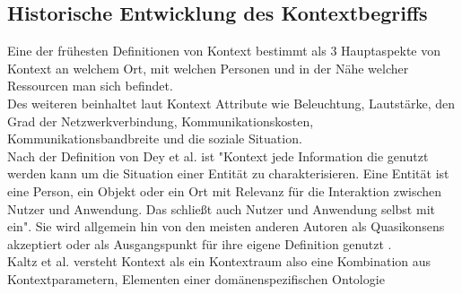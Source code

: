 \subsection{Historische Entwicklung des Kontextbegriffs}


Eine der frühesten Definitionen von Kontext \cite{schilit_context-aware_1994} bestimmt als 3 Hauptaspekte von Kontext an welchem Ort, mit welchen Personen und in der Nähe welcher Ressourcen man sich befindet.\\
Des weiteren beinhaltet laut  \cite{schilit_context-aware_1994} Kontext Attribute wie Beleuchtung, Lautstärke, den Grad der Netzwerkverbindung, Kommunikationskosten, Kommunikationsbandbreite und die soziale Situation.\\
Nach der Definition von Dey et al. \cite{dey_understanding_2001} ist "Kontext jede Information die genutzt werden kann um die Situation einer Entität zu charakterisieren. Eine Entität ist eine Person, ein Objekt oder ein Ort mit Relevanz für die Interaktion zwischen Nutzer und Anwendung. Das schließt auch Nutzer und Anwendung selbst mit ein".
Sie wird allgemein hin von den meisten anderen Autoren als Quasikonsens akzeptiert \cite{wei_liu_survey_2011,alegre_engineering_2016,aguilar_cameonto_2018} oder als Ausgangspunkt für ihre eigene Definition genutzt \cite{kokinov_operational_2007,kayes_icaf_2012}.\\
Kaltz et al. \cite{wolfgang_kaltz_context-aware_2005} versteht Kontext als ein Kontextraum also eine Kombination aus Kontextparametern, Elementen einer domänenspezifischen Ontologie %
